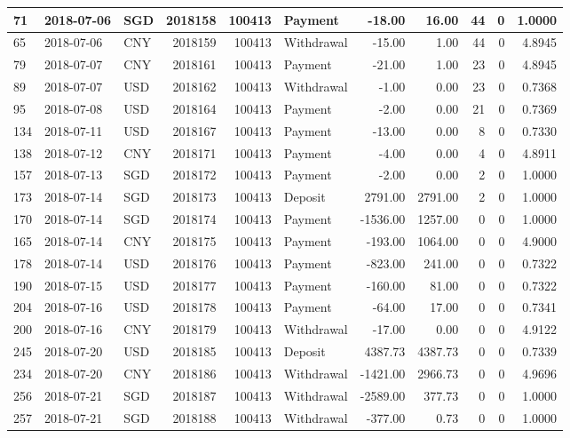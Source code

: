 \documentclass[]{article}
\begin{document}
\begin{table}[H]
\begin{tabular}{l|l|l|r|r|l|r|r|r|r|r}
\hline
71 & 2018-07-06 & SGD & 2018158 & 100413 & Payment & -18.00 & 16.00 & 44 & 0 & 1.0000\\
\hline
65 & 2018-07-06 & CNY & 2018159 & 100413 & Withdrawal & -15.00 & 1.00 & 44 & 0 & 4.8945\\
\hline
79 & 2018-07-07 & CNY & 2018161 & 100413 & Payment & -21.00 & 1.00 & 23 & 0 & 4.8945\\
\hline
89 & 2018-07-07 & USD & 2018162 & 100413 & Withdrawal & -1.00 & 0.00 & 23 & 0 & 0.7368\\
\hline
95 & 2018-07-08 & USD & 2018164 & 100413 & Payment & -2.00 & 0.00 & 21 & 0 & 0.7369\\
\hline
134 & 2018-07-11 & USD & 2018167 & 100413 & Payment & -13.00 & 0.00 & 8 & 0 & 0.7330\\
\hline
138 & 2018-07-12 & CNY & 2018171 & 100413 & Payment & -4.00 & 0.00 & 4 & 0 & 4.8911\\
\hline
157 & 2018-07-13 & SGD & 2018172 & 100413 & Payment & -2.00 & 0.00 & 2 & 0 & 1.0000\\
\hline
173 & 2018-07-14 & SGD & 2018173 & 100413 & Deposit & 2791.00 & 2791.00 & 2 & 0 & 1.0000\\
\hline
170 & 2018-07-14 & SGD & 2018174 & 100413 & Payment & -1536.00 & 1257.00 & 0 & 0 & 1.0000\\
\hline
165 & 2018-07-14 & CNY & 2018175 & 100413 & Payment & -193.00 & 1064.00 & 0 & 0 & 4.9000\\
\hline
178 & 2018-07-14 & USD & 2018176 & 100413 & Payment & -823.00 & 241.00 & 0 & 0 & 0.7322\\
\hline
190 & 2018-07-15 & USD & 2018177 & 100413 & Payment & -160.00 & 81.00 & 0 & 0 & 0.7322\\
\hline
204 & 2018-07-16 & USD & 2018178 & 100413 & Payment & -64.00 & 17.00 & 0 & 0 & 0.7341\\
\hline
200 & 2018-07-16 & CNY & 2018179 & 100413 & Withdrawal & -17.00 & 0.00 & 0 & 0 & 4.9122\\
\hline
245 & 2018-07-20 & USD & 2018185 & 100413 & Deposit & 4387.73 & 4387.73 & 0 & 0 & 0.7339\\
\hline
234 & 2018-07-20 & CNY & 2018186 & 100413 & Withdrawal & -1421.00 & 2966.73 & 0 & 0 & 4.9696\\
\hline
256 & 2018-07-21 & SGD & 2018187 & 100413 & Withdrawal & -2589.00 & 377.73 & 0 & 0 & 1.0000\\
\hline
257 & 2018-07-21 & SGD & 2018188 & 100413 & Withdrawal & -377.00 & 0.73 & 0 & 0 & 1.0000\\
\hline

\end{tabular}
\end{table}
\end{document}
